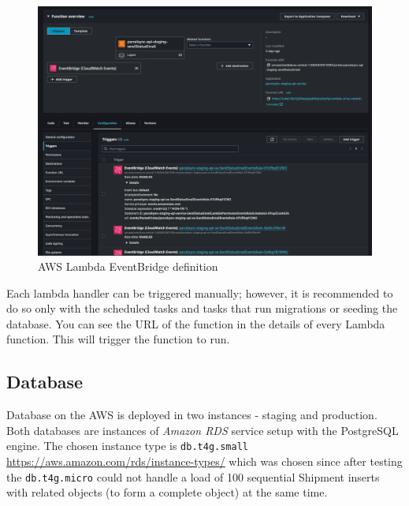 \begin{figure}[p]\centering
\includegraphics[width=140mm]{img/docs/fig_aws_eventbridge.png}
\caption{AWS Lambda EventBridge definition}
\label{img:admin-manual-aws.lambda.eventbridge}
\end{figure}

Each lambda handler can be triggered manually; however, it is recommended to do so only with the scheduled tasks and tasks that run migrations or seeding the database.
You can see the URL of the function in the details of every Lambda function.
This will trigger the function to run.


\subsection{Database}
Database on the AWS is deployed in two instances - staging and production.
Both databases are instances of \textit{Amazon RDS} service setup with the PostgreSQL engine.
The chosen instance type is \texttt{db.t4g.small} \url{https://aws.amazon.com/rds/instance-types/} which was chosen since after testing the \texttt{db.t4g.micro} could not handle a load of 100 sequential Shipment inserts with related objects (to form a complete object) at the same time.

